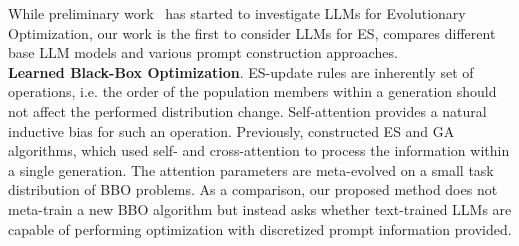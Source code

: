 \documentclass[sigconf]{acmart}
\begin{document}
While preliminary work~\cite{liu2023large, liu2023large_multi} has started to investigate LLMs for Evolutionary Optimization, our work is the first to consider LLMs for ES, compares different base LLM models and various prompt construction approaches.\\
\textbf{Learned Black-Box Optimization}. ES-update rules are inherently set of operations, i.e. the order of the population members within a generation should not affect the performed distribution change. Self-attention provides a natural inductive bias for such an operation. Previously, \citet{lange2023discovering_es, lange2023discovering_ga} constructed ES and GA algorithms, which used self- and cross-attention to process the information within a single generation. The attention parameters are meta-evolved on a small task distribution of BBO problems. As a comparison, our proposed method does not meta-train a new BBO algorithm but instead asks whether text-trained LLMs are capable of performing optimization with discretized prompt information provided.
\end{document}
